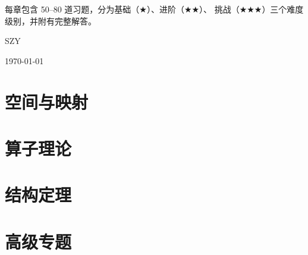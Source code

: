 \documentclass[12pt, a4paper, openany]{book}
\begin{document}
每章包含 50--80 道习题，分为基础（$\bigstar$）、进阶（$\bigstar\bigstar$）、
挑战（$\bigstar\bigstar\bigstar$）三个难度级别，并附有完整解答。

\vspace{1cm}
\hfill SZY

\hfill \today

\tableofcontents
\newpage

\part{空间与映射}





\part{算子理论}






\part{结构定理}





\part{高级专题}




\printindex
\end{document}
